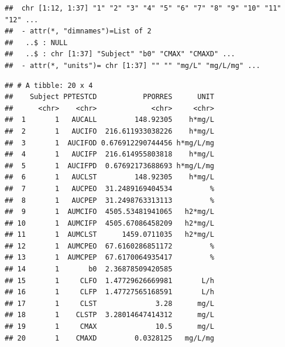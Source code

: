 \documentclass[]{krantz}
\makeatletter
\newenvironment{Shaded}{\begin{snugshade}}{\end{snugshade}}
\newcommand{\KeywordTok}[1]{\textcolor[rgb]{0.13,0.29,0.53}{\textbf{#1}}}
\newcommand{\DataTypeTok}[1]{\textcolor[rgb]{0.13,0.29,0.53}{#1}}
\newcommand{\DecValTok}[1]{\textcolor[rgb]{0.00,0.00,0.81}{#1}}
\newcommand{\StringTok}[1]{\textcolor[rgb]{0.31,0.60,0.02}{#1}}
\newcommand{\OperatorTok}[1]{\textcolor[rgb]{0.81,0.36,0.00}{\textbf{#1}}}
\newcommand{\NormalTok}[1]{#1}
\newenvironment{kframe}{%
\medskip{}
\setlength{\fboxsep}{.8em}
 \def\at@end@of@kframe{}%
 \ifinner\ifhmode%
  \def\at@end@of@kframe{\end{minipage}}%
  \begin{minipage}{\columnwidth}%
 \fi\fi%
 \def\FrameCommand##1{\hskip\@totalleftmargin \hskip-\fboxsep
 \colorbox{shadecolor}{##1}\hskip-\fboxsep
     \hskip-\linewidth \hskip-\@totalleftmargin \hskip\columnwidth}%
 \MakeFramed {\advance\hsize-\width
   \@totalleftmargin\z@ \linewidth\hsize
   \@setminipage}}%
 {\par\unskip\endMakeFramed%
 \at@end@of@kframe}
\renewenvironment{Shaded}{\begin{kframe}}{\end{kframe}}
\theoremstyle{definition}
\theoremstyle{definition}
\theoremstyle{definition}
\theoremstyle{remark}
\makeatother
\begin{document}
\begin{verbatim}
##  chr [1:12, 1:37] "1" "2" "3" "4" "5" "6" "7" "8" "9" "10" "11" "12" ...
##  - attr(*, "dimnames")=List of 2
##   ..$ : NULL
##   ..$ : chr [1:37] "Subject" "b0" "CMAX" "CMAXD" ...
##  - attr(*, "units")= chr [1:37] "" "" "mg/L" "mg/L/mg" ...
\end{verbatim}

\begin{Shaded}
\end{Shaded}

\begin{verbatim}
## # A tibble: 20 x 4
##    Subject PPTESTCD           PPORRES      UNIT
##      <chr>    <chr>             <chr>     <chr>
##  1       1   AUCALL         148.92305    h*mg/L
##  2       1   AUCIFO  216.611933038226    h*mg/L
##  3       1  AUCIFOD 0.676912290744456 h*mg/L/mg
##  4       1   AUCIFP  216.614955803818    h*mg/L
##  5       1  AUCIFPD  0.67692173688693 h*mg/L/mg
##  6       1   AUCLST         148.92305    h*mg/L
##  7       1   AUCPEO  31.2489169404534         %
##  8       1   AUCPEP  31.2498763313113         %
##  9       1  AUMCIFO  4505.53481941065   h2*mg/L
## 10       1  AUMCIFP  4505.67086458209   h2*mg/L
## 11       1  AUMCLST      1459.0711035   h2*mg/L
## 12       1  AUMCPEO  67.6160286851172         %
## 13       1  AUMCPEP  67.6170064935417         %
## 14       1       b0  2.36878509420585          
## 15       1     CLFO  1.47729626669981       L/h
## 16       1     CLFP  1.47727565168591       L/h
## 17       1     CLST              3.28      mg/L
## 18       1    CLSTP  3.28014647414312      mg/L
## 19       1     CMAX              10.5      mg/L
## 20       1    CMAXD         0.0328125   mg/L/mg
\end{verbatim}
\end{document}
